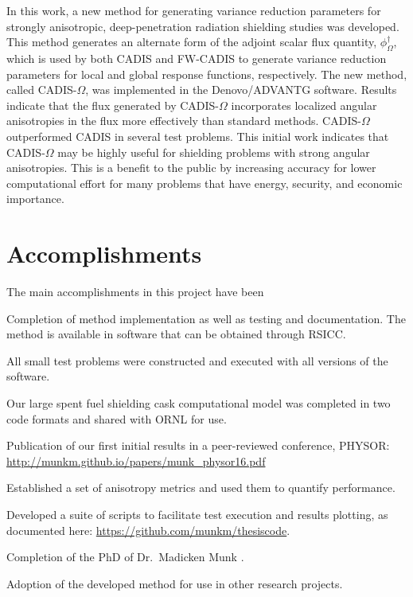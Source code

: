 \documentclass[12pt]{article}
\begin{document}
In this work, a new method for generating variance reduction parameters for strongly anisotropic, deep-penetration radiation shielding studies was developed. This method generates an alternate form of the adjoint scalar flux quantity, $\phi^{\dagger}_{\Omega}$, which is used by both CADIS and FW-CADIS to generate variance reduction parameters for local and global response functions, respectively. The new method, called CADIS-$\Omega$, was implemented in the Denovo/ADVANTG software. Results indicate that the flux generated by CADIS-$\Omega$ incorporates localized angular anisotropies in the flux more effectively than standard methods. CADIS-$\Omega$ outperformed CADIS in several test problems. This initial work indicates that CADIS-$\Omega$ may be highly useful for shielding problems with strong angular anisotropies. This is a benefit to the public by increasing accuracy for lower computational effort for many problems that have energy, security, and economic importance. 

\clearpage


\section{Accomplishments}
\label{sect::accomplishments}

The main accomplishments in this project have been 
\begin{compactitem}
\item Completion of method implementation as well as testing and documentation. The method is available in software that can be obtained through RSICC.
\item All small test problems were constructed and executed with all versions of the software. 
\item Our large spent fuel shielding cask computational model was completed in two code formats and shared with ORNL for use.
\item Publication of our first initial results in a peer-reviewed conference, PHYSOR: \url{http://munkm.github.io/papers/munk\_physor16.pdf}
\item Established a set of anisotropy metrics and used them to quantify performance. 
\item Developed a suite of scripts to facilitate test execution and results plotting, as documented here: \url{https://github.com/munkm/thesiscode}.
\item Completion of the PhD of Dr.\ Madicken Munk \cite{Munk2017}.
\item Adoption of the developed method for use in other research projects.
\end{compactitem}
\end{document}
